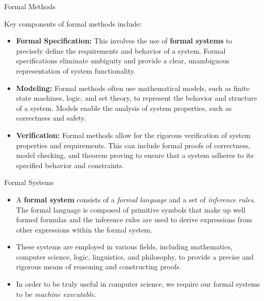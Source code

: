 \documentclass{beamer}
\begin{document}
\begin{frame}{Formal Methods}


Key components of formal methods include:

\begin{itemize}
\item
{\bf Formal Specification:} This involves the use of  {\bf formal systems} to precisely define the requirements and behavior of a system. Formal specifications eliminate ambiguity and provide a clear, unambiguous representation of system functionality.

\item
{\bf Modeling:} Formal methods often use mathematical models, such as finite state machines,  logic, and set theory, to represent the behavior and structure of a system. Models enable the analysis of system properties, such as correctness and safety.

\item
{\bf Verification:} Formal methods allow for the rigorous verification of system properties and requirements. This can include formal proofs of correctness, model checking, and theorem proving to ensure that a system adheres to its specified behavior and constraints.
\end{itemize}
\end{frame}



\begin{frame}{Formal Systems}
\begin{itemize}
\item
A {\bf formal system} consists of a {\em formal language} and a set of  {\em inference rules}.
The formal language is composed of
primitive symbols that make up well formed formulas and the inference rules are used to derive expressions from other expressions within the formal system. 

\item
These systems are employed in various fields, including mathematics, computer science, logic, linguistics, and philosophy, to provide a precise and rigorous means of reasoning and constructing proofs.

\item
In order to be truly useful in computer science, we require our formal systems to be {\em machine executable}.

\end{itemize}

\end{frame}
\end{document}
